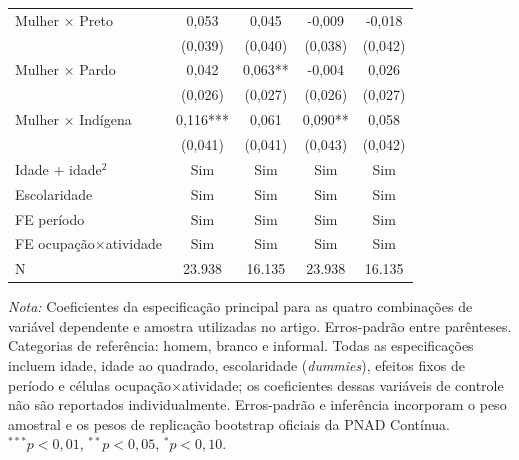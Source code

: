 \documentclass[12pt]{article}
\begin{document}
\begin{table}[htbp]
\begin{tabular}{lcccc}
Mulher $\times$ Preto
& 0,053
& 0,045
& -0,009
& -0,018 \\
&(0,039)
&(0,040)
&(0,038)
&(0,042) \\[0.3em]

Mulher $\times$ Pardo
& 0,042
& 0,063**
& -0,004
& 0,026 \\
&(0,026)
&(0,027)
&(0,026)
&(0,027) \\[0.3em]

Mulher $\times$ Ind\'igena
& 0,116***
& 0,061
& 0,090**
& 0,058 \\
&(0,041)
&(0,041)
&(0,043)
&(0,042) \\[0.3em]

\midrule
Idade + idade$^2$
& Sim & Sim & Sim & Sim \\
Escolaridade
& Sim & Sim & Sim & Sim \\
FE per\'iodo
& Sim & Sim & Sim & Sim \\
FE ocupa\c{c}\~ao$\times$atividade
& Sim & Sim & Sim & Sim \\
\midrule
N
& 23.938 & 16.135 & 23.938 & 16.135 \\
\bottomrule
\end{tabular}

\vspace{0.15cm}
\begin{minipage}{0.97\textwidth}
\scriptsize
\textit{Nota:} Coeficientes da especifica\c{c}\~ao principal para
as quatro combina\c{c}\~oes de vari\'avel dependente e amostra utilizadas no
artigo. Erros-padr\~ao entre par\^enteses. Categorias de refer\^encia: homem,
branco e informal. Todas as especifica\c{c}\~oes incluem idade, idade ao
quadrado, escolaridade (\textit{dummies}), efeitos fixos de per\'iodo e c\'elulas
ocupa\c{c}\~ao$\times$atividade; os coeficientes dessas vari\'aveis de controle
n\~ao s\~ao reportados individualmente. Erros-padr\~ao e infer\^encia incorporam
o peso amostral e os pesos de replica\c{c}\~ao bootstrap oficiais da PNAD
Cont\'inua. $^{***}p<0,01$, $^{**}p<0,05$, $^{*}p<0,10$.
\end{minipage}
\end{table}
\end{document}
